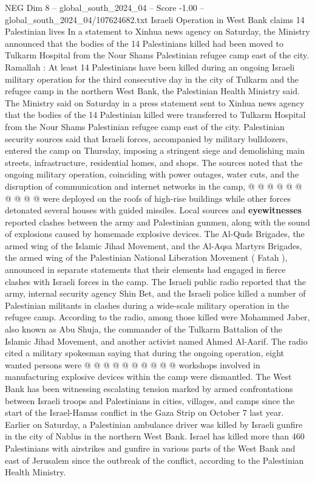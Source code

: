 \begin{textsample}{NEG Dim 8 – global\_south\_2024\_04 – Score -1.00 – global\_south\_2024\_04/107624682.txt}  \label{ex:f8_neg_262}
Israeli Operation in West Bank claims 14 Palestinian lives In a statement to Xinhua news agency on Saturday, the Ministry announced that the bodies of the 14 Palestinians killed had been moved to Tulkarm Hospital from the Nour Shams Palestinian refugee camp east of the city.
Ramallah : At least 14 Palestinians have been killed during an ongoing Israeli military operation for the third consecutive day in the city of Tulkarm and the refugee camp in the northern West Bank, the Palestinian Health Ministry said.
The Ministry said on Saturday in a press statement sent to Xinhua news agency that the bodies of the 14 Palestinian killed were transferred to Tulkarm Hospital from the Nour Shams Palestinian refugee camp east of the city.
Palestinian security sources said that Israeli forces, accompanied by military bulldozers, entered the camp on Thursday, imposing a stringent siege and demolishing main streets, infrastructure, residential homes, and shops.
The sources noted that the ongoing military operation, coinciding with power outages, water cuts, and the disruption of communication and internet networks in the camp, @ @ @ @ @ @ @ @ @ @ were deployed on the roofs of high-rise buildings while other forces detonated several houses with guided missiles.
Local sources and \textbf{eyewitnesses} reported clashes between the army and Palestinian gunmen, along with the sound of explosions caused by homemade explosive devices.
The Al-Quds Brigades, the armed wing of the Islamic Jihad Movement, and the Al-Aqsa Martyrs Brigades, the armed wing of the Palestinian National Liberation Movement ( Fatah ), announced in separate statements that their elements had engaged in fierce clashes with Israeli forces in the camp.
The Israeli public radio reported that the army, internal security agency Shin Bet, and the Israeli police killed a number of Palestinian militants in clashes during a wide-scale military operation in the refugee camp.
According to the radio, among those killed were Mohammed Jaber, also known as Abu Shuja, the commander of the Tulkarm Battalion of the Islamic Jihad Movement, and another activist named Ahmed Al-Aarif.
The radio cited a military spokesman saying that during the ongoing operation, eight wanted persons were @ @ @ @ @ @ @ @ @ @ workshops involved in manufacturing explosive devices within the camp were dismantled.
The West Bank has been witnessing escalating tension marked by armed confrontations between Israeli troops and Palestinians in cities, villages, and camps since the start of the Israel-Hamas conflict in the Gaza Strip on October 7 last year.
Earlier on Saturday, a Palestinian ambulance driver was killed by Israeli gunfire in the city of Nablus in the northern West Bank.
Israel has killed more than 460 Palestinians with airstrikes and gunfire in various parts of the West Bank and east of Jerusalem since the outbreak of the conflict, according to the Palestinian Health Ministry.

\end{textsample}
